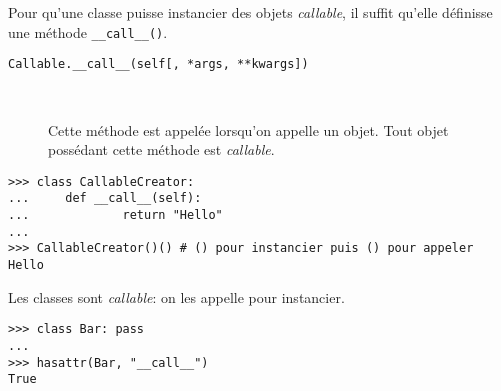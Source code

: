 Pour qu'une classe puisse instancier des objets \emph{callable}, il suffit qu'elle définisse une méthode
\texttt{__call__()}.

\begin{description}
    \item[\texttt{Callable.__call__(self[, *args, **kwargs])}]~
 
    Cette méthode est appelée lorsqu'on appelle un objet. Tout objet possédant cette méthode est \emph{callable}.
\end{description}

\begin{verbatim}
>>> class CallableCreator:
...     def __call__(self):
...             return "Hello"
...
>>> CallableCreator()() # () pour instancier puis () pour appeler
Hello
\end{verbatim}


Les classes sont \emph{callable}: on les appelle pour instancier.
\begin{verbatim}
>>> class Bar: pass
...
>>> hasattr(Bar, "__call__")
True
\end{verbatim}
